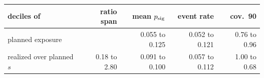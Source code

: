 \begin{tabular}{lrrrr}
\toprule
deciles of & ratio span & mean $p_{\mathrm{sig}}$ & event rate & cov.\ 90 \\
\midrule
planned exposure &  & 0.055 to 0.125 & 0.052 to 0.121 & 0.76 to 0.96 \\
realized over planned $s$ & 0.18 to 2.80 & 0.091 to 0.100 & 0.057 to 0.112 & 1.00 to 0.68 \\
\bottomrule
\end{tabular}
